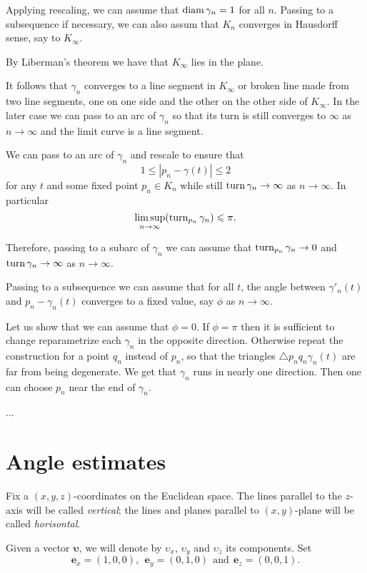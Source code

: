 \documentclass[a4paper,10pt]{amsart}
\begin{document}
Applying rescaling, we can assume that $\operatorname{diam}\gamma_n=1$ for all $n$.
Passing to a subsequence if necessary, we can also assum that $K_n$ converges in Hausdorff sense, say to $K_\infty$.

By Liberman's theorem we have that $K_\infty$ lies in the plane.

It follows that $\gamma_n$ converges to a line segment in $K_\infty$
or broken line made from two line segments, one on one side and the other on the other side of $K_\infty$.
In the later case we can pass to an arc of $\gamma_n$ so that its turn is still converges to $\infty$ as $n\to\infty$ and the limit curve is a line segment.

We can pass to an arc of $\gamma_n$ and rescale to ensure that 
\[1\le|p_n-\gamma(t)|\le 2\] 
for any $t$ and some fixed point $p_n\in K_n$
while still $\mathop{\rm turn}\nolimits\gamma_n\to\infty$ as $n\to \infty$.
In particular 
\[\limsup_{n\to\infty}(\mathop{\rm turn}\nolimits_{p_n}\gamma_n)\leqslant \pi.\]

Therefore, passing to a subarc of $\gamma_n$ we can assume that 
$\mathop{\rm turn}\nolimits_{p_n}\gamma_n\to0$ and $\mathop{\rm turn}\nolimits\gamma_n\to\infty$ as $n\to\infty$.

Passing to a subsequence we can assume that for all $t$, 
the angle between $\gamma'_n(t)$ and $p_n-\gamma_n(t)$ 
converges to a fixed value, 
say $\phi$ 
as $n\to \infty$.

Let us show that we can assume that $\phi=0$.
If $\phi=\pi$ then it is sufficient to change reparametrize each $\gamma_n$ in the opposite direction.
Otherwise repeat the construction for a point $q_n$ instead of $p_n$, 
so that the triangles $\triangle p_nq_n\gamma_n(t)$ are far from being degenerate.
We get that $\gamma_n$ runs in nearly one direction.
Then one can choose $p_n$ near the end of $\gamma_n$.

...
\qeds


\section{Angle estimates}

Fix a $(x,y,z)$-coordinates on the Euclidean space.
The lines parallel to the $z$-axis will be called \emph{vertical};
the lines and planes parallel to $(x,y)$-plane will be called \emph{horisontal}.

Given a vector $\bm{\upsilon}$, we will denote by $\upsilon_x$, $\upsilon_y$ and $\upsilon_z$ its components.
Set 
\[\bm{e}_x=(1,0,0),\ \ \bm{e}_y=(0,1,0)\ \ \text{and}\ \ \bm{e}_z=(0,0,1).\]
\end{document}
